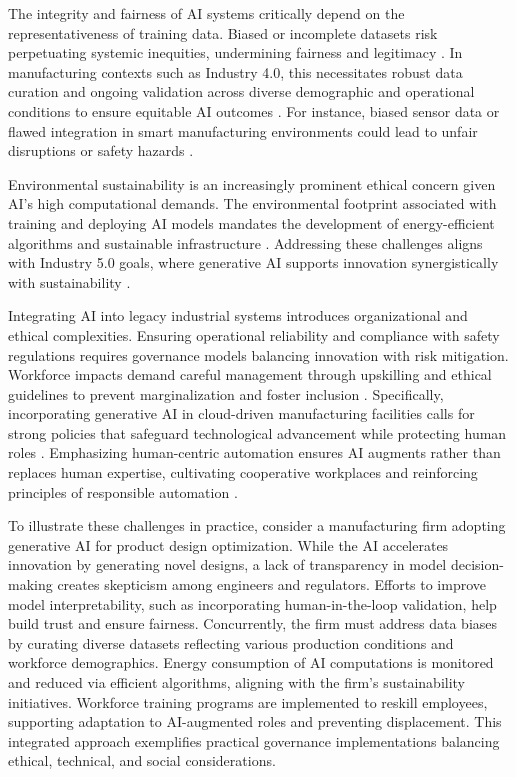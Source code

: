 \documentclass[sigconf]{acmart}
\begin{document}
The integrity and fairness of AI systems critically depend on the representativeness of training data. Biased or incomplete datasets risk perpetuating systemic inequities, undermining fairness and legitimacy \cite{ref37}. In manufacturing contexts such as Industry 4.0, this necessitates robust data curation and ongoing validation across diverse demographic and operational conditions to ensure equitable AI outcomes \cite{ref20}. For instance, biased sensor data or flawed integration in smart manufacturing environments could lead to unfair disruptions or safety hazards \cite{ref38}.

Environmental sustainability is an increasingly prominent ethical concern given AI's high computational demands. The environmental footprint associated with training and deploying AI models mandates the development of energy-efficient algorithms and sustainable infrastructure \cite{ref19}. Addressing these challenges aligns with Industry 5.0 goals, where generative AI supports innovation synergistically with sustainability \cite{ref6}.

Integrating AI into legacy industrial systems introduces organizational and ethical complexities. Ensuring operational reliability and compliance with safety regulations requires governance models balancing innovation with risk mitigation. Workforce impacts demand careful management through upskilling and ethical guidelines to prevent marginalization and foster inclusion \cite{ref11,ref12,ref38}. Specifically, incorporating generative AI in cloud-driven manufacturing facilities calls for strong policies that safeguard technological advancement while protecting human roles \cite{ref11,ref12}. Emphasizing human-centric automation ensures AI augments rather than replaces human expertise, cultivating cooperative workplaces and reinforcing principles of responsible automation \cite{ref2}.

To illustrate these challenges in practice, consider a manufacturing firm adopting generative AI for product design optimization. While the AI accelerates innovation by generating novel designs, a lack of transparency in model decision-making creates skepticism among engineers and regulators. Efforts to improve model interpretability, such as incorporating human-in-the-loop validation, help build trust and ensure fairness. Concurrently, the firm must address data biases by curating diverse datasets reflecting various production conditions and workforce demographics. Energy consumption of AI computations is monitored and reduced via efficient algorithms, aligning with the firm's sustainability initiatives. Workforce training programs are implemented to reskill employees, supporting adaptation to AI-augmented roles and preventing displacement. This integrated approach exemplifies practical governance implementations balancing ethical, technical, and social considerations.
\end{document}
